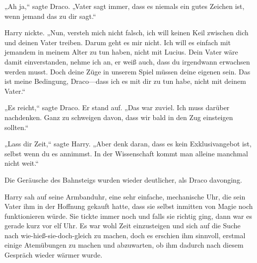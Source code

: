 „Ah ja,“ sagte Draco. „Vater sagt immer, dass es niemals ein gutes Zeichen ist, wenn jemand das zu dir sagt.“

Harry nickte. „Nun, versteh mich nicht falsch, ich will keinen Keil zwischen dich und deinen Vater treiben. Darum geht es mir nicht. Ich will es einfach mit jemandem in meinem Alter zu tun haben, nicht mit Lucius. Dein Vater wäre damit einverstanden, nehme ich an, er weiß auch, dass du irgendwann erwachsen werden musst. Doch deine Züge in unserem Spiel müssen deine eigenen sein. Das ist meine Bedingung, Draco—dass ich es mit dir zu tun habe, nicht mit deinem Vater.“

„Es reicht,“ sagte Draco. Er stand auf. „Das war zuviel. Ich muss darüber nachdenken. Ganz zu schweigen davon, dass wir bald in den Zug einsteigen sollten.“

„Lass dir Zeit,“ sagte Harry. „Aber denk daran, dass es kein Exklusivangebot ist, selbst wenn du es annimmst. In der Wissenschaft kommt man alleine manchmal nicht weit.“

Die Geräusche des Bahnsteigs wurden wieder deutlicher, als Draco davonging.

Harry sah auf seine Armbanduhr, eine sehr einfache, mechanische Uhr, die sein Vater ihm in der Hoffnung gekauft hatte, dass sie selbst inmitten von Magie noch funktionieren würde. Sie tickte immer noch und falls sie richtig ging, dann war es gerade kurz vor elf Uhr. Es war wohl Zeit einzusteigen und sich auf die Suche nach wie-hieß-sie-doch-gleich zu machen, doch es erschien ihm sinnvoll, erstmal einige Atemübungen zu machen und abzuwarten, ob ihm dadurch nach diesem Gespräch wieder wärmer wurde.

